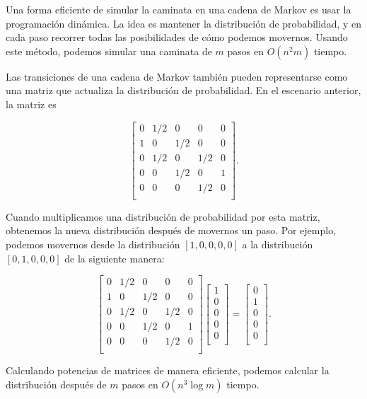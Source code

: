 Una forma eficiente de simular la caminata en
una cadena de Markov es usar la programación dinámica.
La idea es mantener la distribución de probabilidad,
y en cada paso recorrer todas las posibilidades
de cómo podemos movernos.
Usando este método, podemos simular
una caminata de $m$ pasos en $O(n^2 m)$ tiempo.

Las transiciones de una cadena de Markov también pueden
representarse como una matriz que actualiza la
distribución de probabilidad.
En el escenario anterior, la matriz es

\[ 
 \begin{bmatrix}
  0 & 1/2 & 0 & 0 & 0 \\
  1 & 0 & 1/2 & 0 & 0 \\
  0 & 1/2 & 0 & 1/2 & 0 \\
  0 & 0 & 1/2 & 0 & 1 \\
  0 & 0 & 0 & 1/2 & 0 \\
 \end{bmatrix}.
\]

Cuando multiplicamos una distribución de probabilidad por esta matriz,
obtenemos la nueva distribución después de movernos un paso.
Por ejemplo, podemos movernos desde la distribución
$[1,0,0,0,0]$ a la distribución
$[0,1,0,0,0]$ de la siguiente manera:

\[ 
 \begin{bmatrix}
  0 & 1/2 & 0 & 0 & 0 \\
  1 & 0 & 1/2 & 0 & 0 \\
  0 & 1/2 & 0 & 1/2 & 0 \\
  0 & 0 & 1/2 & 0 & 1 \\
  0 & 0 & 0 & 1/2 & 0 \\
 \end{bmatrix}
 \begin{bmatrix}
  1 \\
  0 \\
  0 \\
  0 \\
  0 \\
 \end{bmatrix}
=
 \begin{bmatrix}
  0 \\
  1 \\
  0 \\
  0 \\
  0 \\
 \end{bmatrix}.
\]

Calculando potencias de matrices de manera eficiente,
podemos calcular la distribución después de $m$ pasos
en $O(n^3 \log m)$ tiempo.

